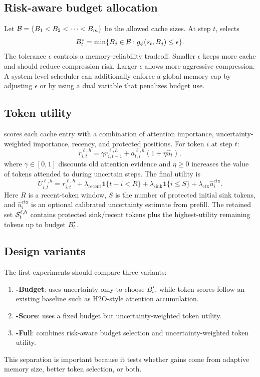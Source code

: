\subsection{Risk-aware budget allocation}

Let $\mathcal{B} = \{B_1 < B_2 < \cdots < B_m\}$ be the allowed cache sizes. At step $t$, \uckv{} selects
\[
B_t^\star = \min \{B_j \in \mathcal{B} : g_{\phi}(s_t,B_j) \le \epsilon\}.
\]
The tolerance $\epsilon$ controls a memory-reliability tradeoff. Smaller $\epsilon$ keeps more cache and should reduce compression risk. Larger $\epsilon$ allows more aggressive compression. A system-level scheduler can additionally enforce a global memory cap by adjusting $\epsilon$ or by using a dual variable that penalizes budget use.

\subsection{Token utility}

\uckv{} scores each cache entry with a combination of attention importance, uncertainty-weighted importance, recency, and protected positions. For token $i$ at step $t$:
\[
r_{i,t}^{\ell,h}
= \gamma r_{i,t-1}^{\ell,h}
+ a_{t,i}^{\ell,h} (1+\eta \hat{u}_t),
\]
where $\gamma \in [0,1]$ discounts old attention evidence and $\eta \ge 0$ increases the value of tokens attended to during uncertain steps. The final utility is
\[
U_{i,t}^{\ell,h}
= r_{i,t}^{\ell,h}
+ \lambda_{\mathrm{recent}}\mathbf{1}\{t-i < R\}
+ \lambda_{\mathrm{sink}}\mathbf{1}\{i \le S\}
+ \lambda_{\mathrm{ctx}}\hat{u}_{i}^{\mathrm{ctx}}.
\]
Here $R$ is a recent-token window, $S$ is the number of protected initial sink tokens, and $\hat{u}_{i}^{\mathrm{ctx}}$ is an optional calibrated uncertainty estimate from prefill. The retained set $\mathcal{S}_t^{\ell,h}$ contains protected sink/recent tokens plus the highest-utility remaining tokens up to budget $B_t^\star$.

\subsection{Design variants}

The first experiments should compare three variants:

\begin{enumerate}[leftmargin=*]
    \item \textbf{\uckv{}-Budget}: uses uncertainty only to choose $B_t^\star$, while token scores follow an existing baseline such as H2O-style attention accumulation.
    \item \textbf{\uckv{}-Score}: uses a fixed budget but uncertainty-weighted token utility.
    \item \textbf{\uckv{}-Full}: combines risk-aware budget selection and uncertainty-weighted token utility.
\end{enumerate}

This separation is important because it tests whether gains come from adaptive memory size, better token selection, or both.

